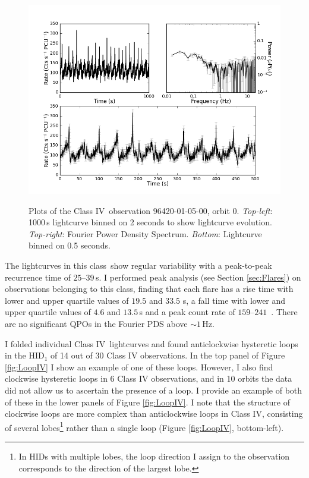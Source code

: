 \begin{figure}
    \includegraphics[width=0.8\columnwidth, trim = 0.6cm 0 3.9cm 0]{images/Jmulti.png}\\
    \captionsetup{singlelinecheck=off}
    \caption[Characteristic lightcurves and a power spectrum of Type IV variability.]{Plots of the Class IV\indexiv\ observation 96420-01-05-00, orbit 0.  \textit{Top-left}: 1000\,s lightcurve binned on 2 seconds to show lightcurve evolution.  \textit{Top-right}: Fourier Power Density Spectrum.  \textit{Bottom}: Lightcurve binned on 0.5 seconds.}
   \label{fig:Jmulti}
\end{figure}

\par The lightcurves in this class\indexiv\ show regular variability with a peak-to-peak recurrence time of $25$--$39$\,s.  I performed peak analysis (see Section \ref{sec:Flares}) on observations belonging to this class, finding that each flare has a rise time with lower and upper quartile values of $19.5$ and $33.5$ s, a fall time with lower and upper quartile values of $4.6$ and $13.5$\,s and a peak count rate of $159$--$241$\spcu\ .  There are no significant QPOs in the Fourier PDS above $\sim1$\,Hz.
\par I folded individual Class IV\indexiv\ lightcurves and found anticlockwise hysteretic loops in the HID$_1$ of 14 out of 30 Class IV observations.  In the top panel of Figure \ref{fig:LoopIV} I show an example of one of these loops.  However, I also find clockwise hysteretic loops in 6 Class IV observations, and in 10 orbits the data did not allow us to ascertain the presence of a loop.  I provide an example of both of these in the lower panels of Figure \ref{fig:LoopIV}.  I note that the structure of clockwise loops are more complex than anticlockwise loops in Class IV, consisting of several lobes\footnote{In HIDs with multiple lobes, the loop direction I assign to the observation corresponds to the direction of the largest lobe.} rather than a single loop (Figure \ref{fig:LoopIV}, bottom-left).


